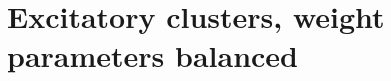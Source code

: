 \documentclass[11pt,reqno]{amsart}
\begin{document}
% 


\section{Excitatory clusters, weight parameters balanced}
\end{document}
